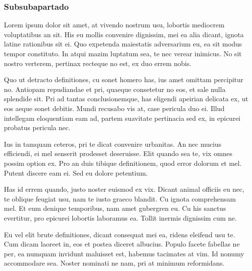          \subsubsection{Subsubapartado}
            Lorem ipsum dolor sit amet, at vivendo nostrum usu, lobortis mediocrem voluptatibus an sit.
            His eu mollis convenire dignissim, mei ea alia dicant, ignota latine rationibus sit ei. Quo
            expetenda maiestatis adversarium eu, ea sit modus tempor constituto. In atqui mazim luptatum
            sea, te nec verear inimicus. No sit nostro verterem, pertinax recteque no est, ex duo errem nobis.
            
            Quo ut detracto definitiones, cu sonet homero has, ius amet omittam percipitur no. Antiopam
            repudiandae et pri, quaeque consetetur no eos, et sale nulla splendide sit. Pri ad tantas
            conclusionemque, has eligendi apeirian delicata ex, ut eos aeque sonet debitis. Mundi recusabo
            vis at, case pericula duo ei. Illud intellegam eloquentiam eam ad, partem suavitate pertinacia sed
            ex, in epicurei probatus pericula nec.
            
            Ius in tamquam ceteros, pri te dicat convenire urbanitas. An nec mucius efficiendi, ei mel
            senserit prodesset deseruisse. Elit quando sea te, vix omnes possim option ex. Pro an duis tibique
            definitionem, quod error dolorum et mel. Putent discere eam ei. Sed eu dolore petentium.
            
            Has id errem quando, justo noster euismod ex vix. Dicant animal officiis eu nec, te oblique
            feugiat usu, nam te iusto graeco blandit. Cu ignota comprehensam mel. Et eum denique
            temporibus, nam amet gubergren eu. Cu his sanctus evertitur, pro epicurei lobortis laboramus ea.
            Tollit inermis dignissim cum ne.

            Eu vel elit brute definitiones, dicant consequat mei ea, ridens eleifend usu te. Cum dicam
            laoreet in, eos et postea diceret albucius. Populo facete fabellas ne per, ea numquam invidunt
            maluisset est, habemus tacimates at vim. Id nonumy accommodare sea. Noster nominati ne nam,
            pri at minimum reformidans.
            
